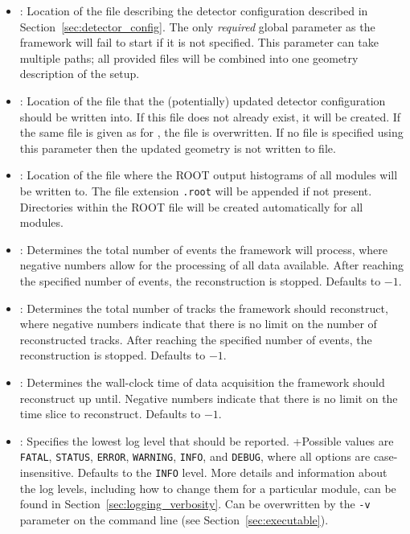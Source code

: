 \begin{itemize}
\item {}: Location of the file describing the detector configuration described in Section~\ref{sec:detector_config}.
The only \textit{required} global parameter as the framework will fail to start if it is not specified.
This parameter can take multiple paths; all provided files will be combined into one geometry description of the setup.
\item {}: Location of the file that the (potentially) updated detector configuration should be written into. If this file does not already exist, it will be created. If the same file is given as for , the file is overwritten. If no file is specified using this parameter then the updated geometry is not written to file.
\item {}: Location of the file where the ROOT output histograms of all modules will be written to. The file extension \texttt{.root} will be appended if not present. Directories within the ROOT file will be created automatically for all modules.
\item {}: Determines the total number of events the framework will process, where negative numbers allow for the processing of all data available.
After reaching the specified number of events, the reconstruction is stopped.
Defaults to $-1$.
\item {}: Determines the total number of tracks the framework should reconstruct, where negative numbers indicate that there is no limit on the number of reconstructed tracks.
After reaching the specified number of events, the reconstruction is stopped.
Defaults to $-1$.
\item {}: Determines the wall-clock time of data acquisition the framework should reconstruct up until. Negative numbers indicate that there is no limit on the time slice to reconstruct.
Defaults to $-1$.
\item {}: Specifies the lowest log level that should be reported.
+Possible values are \texttt{FATAL}, \texttt{STATUS}, \texttt{ERROR}, \texttt{WARNING}, \texttt{INFO}, and \texttt{DEBUG}, where all options are case-insensitive.
Defaults to the \texttt{INFO} level.
More details and information about the log levels, including how to change them for a particular module, can be found in Section~\ref{sec:logging_verbosity}.
Can be overwritten by the \texttt{-v} parameter on the command line (see Section~\ref{sec:executable}).

\end{itemize}
